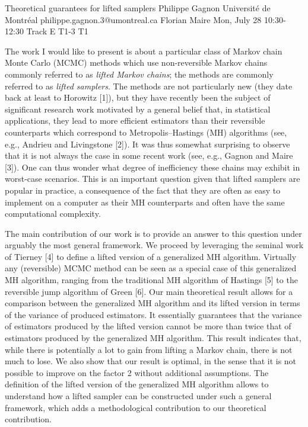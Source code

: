 \begin{talk}
  {Theoretical guarantees for lifted samplers}%
  {Philippe Gagnon}%
  {Université de Montréal}%
  {philippe.gagnon.3@umontreal.ca}%
  {Florian Maire}%
  {}%
  {Mon, July 28 10:30-12:30 Track E}%
  {T1-3}%
  {T1}%
			
The work I would like to present is about a particular class of Markov chain Monte Carlo (MCMC) methods which use non-reversible Markov chains commonly referred to as \textit{lifted Markov chains}; the methods are commonly referred to as \textit{lifted samplers}. The methods are not particularly new (they date back at least to Horowitz [1]), but they have recently been the subject of significant research work motivated by a general belief that, in statistical applications, they lead to more efficient estimators than their reversible counterparts which correspond to Metropolis--Hastings (MH) algorithms (see, e.g., Andrieu and Livingstone [2]). It was thus somewhat surprising to observe that it is not always the case in some recent work (see, e.g., Gagnon and Maire [3]). One can thus wonder what degree of inefficiency these chains may exhibit in worst-case scenarios. This is an important question given that lifted samplers are popular in practice, a consequence of the fact that they are often as easy to implement on a computer as their MH counterparts and often have the same computational complexity.

The main contribution of our work is to provide an answer to this question under arguably the most general framework. We proceed by leveraging the seminal work of Tierney [4] to define a lifted version of a generalized MH algorithm. Virtually any (reversible) MCMC method can be seen as a special case of this generalized MH algorithm, ranging from the traditional MH algorithm of Hastings [5] to the reversible jump algorithm of Green [6]. Our main theoretical result allows for a comparison between the generalized MH algorithm and its lifted version in terms of the variance of produced estimators. It essentially guarantees that the variance of estimators produced by the lifted version cannot be more than twice that of estimators produced by the generalized MH algorithm. This result indicates that, while there is potentially a lot to gain from lifting a Markov chain, there is not much to lose. We also show that our result is optimal, in the sense that it is not possible to improve on the factor 2 without additional assumptions. The definition of the lifted version of the generalized MH algorithm allows to understand how a lifted sampler can be constructed under such a general framework, which adds a methodological contribution to our theoretical contribution.


\end{talk}
